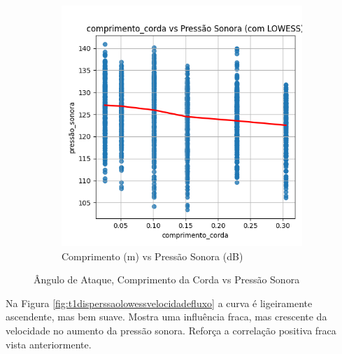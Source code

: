 \documentclass[12pt,a4paper,oneside]{report}
\newcommand{\fig}[1]{Figura \ref{#1}}
\begin{document}
\begin{figure}[!h]
\begin{subfigure}{0.5\textwidth}
	\includegraphics[width=\linewidth]{img/t1_disperssao_lowess_comprimento_corda}
	\caption{Comprimento (m) vs Pressão Sonora (dB)}
	\label{fig:t1disperssaolowesscomprimentocorda}
\end{subfigure}
\caption{Ângulo de Ataque, Comprimento da Corda vs Pressão Sonora}
\end{figure}

Na \fig{fig:t1disperssaolowessvelocidadefluxo} a curva é ligeiramente ascendente, mas bem suave. Mostra uma influência fraca, mas crescente da velocidade no aumento da pressão sonora. Reforça a correlação positiva fraca vista anteriormente.
\end{document}
